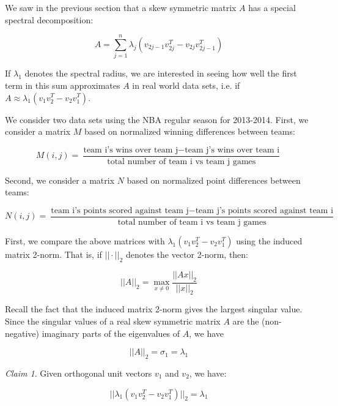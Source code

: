 \documentclass[a4,11pt,twoside,leqno]{report}
\theoremstyle{definition}
\theoremstyle{remark}
\numberwithin{equation}{section}
\newtheorem*{Claim}{Claim}
\begin{document}
We saw in the previous section that a skew symmetric matrix $A$ has a special spectral decomposition:

$$A=\displaystyle \sum_{j=1}^n \lambda_j(v_{2j-1}v_{2j}^T-v_{2j}v_{2j-1}^T)$$

If $\lambda_1$ denotes the spectral radius, we are interested in seeing how well the first term in this sum approximates $A$ in real world data sets, i.e. if $A\approx \lambda_1(v_1v_2^T-v_2v_1^T)$.

We consider two data sets using the NBA regular season for 2013-2014. First, we consider a matrix $M$ based on normalized winning differences between teams:

$$M(i,j)=\frac{\mbox{team i's wins over team j}-\mbox{team j's wins over team i}}{\mbox{total number of team i vs team j games}}$$

Second, we consider a matrix $N$ based on normalized point differences between teams:

$$N(i,j)=\frac{\mbox{team i's points scored against team j}-\mbox{team j's points scored against  team i}}{\mbox{total number of team i vs team j games}}$$

First, we compare the above matrices with $\lambda_1(v_1v_2^T-v_2v_1^T)$ using the induced matrix 2-norm. That is, if $||\cdot||_2$ denotes the vector 2-norm, then:

$$||A||_2=\max_{x\not=0} \frac{||Ax||_2}{||x||_2}$$

Recall the fact that the induced matrix 2-norm gives the largest singular value. Since the singular values of a real skew symmetric matrix $A$ are the (non-negative) imaginary parts of the eigenvalues of $A$, we have

$$||A||_2=\sigma_1=\lambda_1$$

\begin{Claim}

Given orthogonal unit vectors $v_1$ and $v_2$, we have:

$$||\lambda_1(v_1v_2^T-v_2v_1^T)||_2=\lambda_1$$

\end{Claim}
\end{document}
